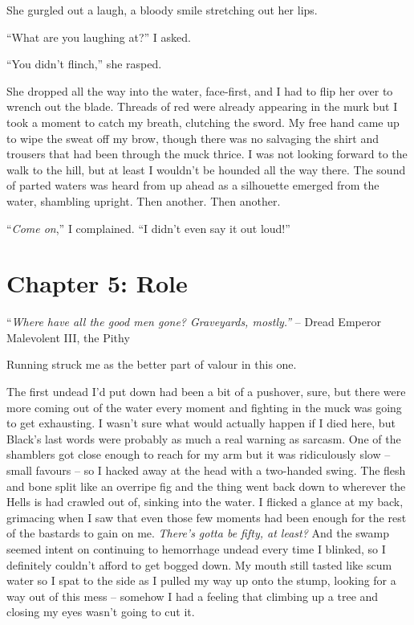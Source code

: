 \documentclass[12pt, openany]{book}
\begin{document}
She gurgled out a laugh, a bloody smile stretching out her lips.

“What are you laughing at?” I asked.

“You didn’t flinch,” she rasped.

She dropped all the way into the water, face-first, and I had to flip her over to wrench out the blade. Threads of red were already appearing in the murk but I took a moment to catch my breath, clutching the sword. My free hand came up to wipe the sweat off my brow, though there was no salvaging the shirt and trousers that had been through the muck thrice. I was not looking forward to the walk to the hill, but at least I wouldn’t be hounded all the way there. The sound of parted waters was heard from up ahead as a silhouette emerged from the water, shambling upright. Then another. Then another.

“\textit{Come on},” I complained. “I didn’t even say it out loud!”
\clearpage
\chapter{Chapter 5: Role}

“\textit{Where have all the good men gone? Graveyards, mostly.”}
– Dread Emperor Malevolent III, the Pithy

Running struck me as the better part of valour in this one.

The first undead I’d put down had been a bit of a pushover, sure, but there were more coming out of the water every moment and fighting in the muck was going to get exhausting. I wasn’t sure what would actually happen if I died here, but Black’s last words were probably as much a real warning as sarcasm. One of the shamblers got close enough to reach for my arm but it was ridiculously slow – small favours – so I hacked away at the head with a two-handed swing. The flesh and bone split like an overripe fig and the thing went back down to wherever the Hells is had crawled out of, sinking into the water. I flicked a glance at my back, grimacing when I saw that even those few moments had been enough for the rest of the bastards to gain on me. \textit{There’s gotta be fifty, at least?} And the swamp seemed intent on continuing to hemorrhage undead every time I blinked, so I definitely couldn’t afford to get bogged down. My mouth still tasted like scum water so I spat to the side as I pulled my way up onto the stump, looking for a way out of this mess – somehow I had a feeling that climbing up a tree and closing my eyes wasn’t going to cut it.
\end{document}
